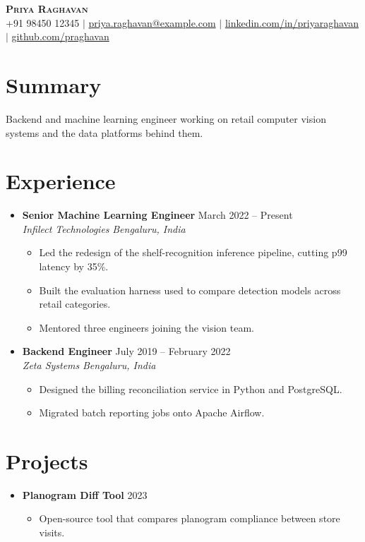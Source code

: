 \documentclass[letterpaper,11pt]{article}
\newcommand{\resumeItem}[1]{\item\small{#1 \vspace{-2pt}}}
\newcommand{\resumeSubheading}[4]{\item\textbf{#1} \hfill #2 \\ \textit{#3} \hfill \textit{#4}}
\newcommand{\resumeProjectHeading}[2]{\item\small{\textbf{#1} \hfill #2}}
\newcommand{\resumeSubHeadingListStart}{\begin{itemize}[leftmargin=0.15in, label={}]}
\newcommand{\resumeSubHeadingListEnd}{\end{itemize}}
\newcommand{\resumeItemListStart}{\begin{itemize}}
\newcommand{\resumeItemListEnd}{\end{itemize}\vspace{-5pt}}
\begin{document}
\begin{center}
    \textbf{\Huge \scshape Priya Raghavan} \\ \vspace{1pt}
    \small +91 98450 12345 $|$ \href{mailto:priya.raghavan@example.com}{priya.raghavan@example.com} $|$
    \href{https://linkedin.com/in/priyaraghavan}{linkedin.com/in/priyaraghavan} $|$
    \href{https://github.com/praghavan}{github.com/praghavan}
\end{center}

\section{Summary}
Backend and machine learning engineer working on retail computer vision systems and the
data platforms behind them.

\section{Experience}
\resumeSubHeadingListStart

  \resumeSubheading
    {Senior Machine Learning Engineer}{March 2022 -- Present}
    {Infilect Technologies}{Bengaluru, India}
    \resumeItemListStart
      \resumeItem{Led the redesign of the shelf-recognition inference pipeline, cutting p99 latency by 35\%.}
      \resumeItem{Built the evaluation harness used to compare detection models across retail categories.}
      \resumeItem{Mentored three engineers joining the vision team.}
    \resumeItemListEnd

  \resumeSubheading
    {Backend Engineer}{July 2019 -- February 2022}
    {Zeta Systems}{Bengaluru, India}
    \resumeItemListStart
      \resumeItem{Designed the billing reconciliation service in Python and PostgreSQL.}
      \resumeItem{Migrated batch reporting jobs onto Apache Airflow.}
    \resumeItemListEnd

\resumeSubHeadingListEnd

\section{Projects}
\resumeSubHeadingListStart
  \resumeProjectHeading{Planogram Diff Tool}{2023}
    \resumeItemListStart
      \resumeItem{Open-source tool that compares planogram compliance between store visits.}
    \resumeItemListEnd
\resumeSubHeadingListEnd
\end{document}
